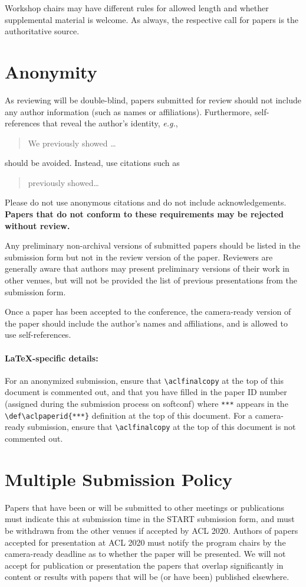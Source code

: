 \documentclass[11pt,a4paper]{article}
\begin{document}
Workshop chairs may have different rules for allowed length and whether supplemental material is welcome.
As always, the respective call for papers is the authoritative source.


\section{Anonymity}
As reviewing will be double-blind, papers submitted for review should not include any author information (such as names or affiliations). Furthermore, self-references that reveal the author's identity, \emph{e.g.},
\begin{quote}
We previously showed \citep{Gusfield:97} \ldots
\end{quote}
should be avoided. Instead, use citations such as 
\begin{quote}
\citet{Gusfield:97} previously showed\ldots
\end{quote}
Please do not use anonymous citations and do not include acknowledgements.
\textbf{Papers that do not conform to these requirements may be rejected without review.}

Any preliminary non-archival versions of submitted papers should be listed in the submission form but not in the review version of the paper.
Reviewers are generally aware that authors may present preliminary versions of their work in other venues, but will not be provided the list of previous presentations from the submission form.

Once a paper has been accepted to the conference, the camera-ready version of the paper should include the author's names and affiliations, and is allowed to use self-references.

\paragraph{\LaTeX-specific details:}
For an anonymized submission, ensure that {\small\verb|\aclfinalcopy|} at the top of this document is commented out, and that you have filled in the paper ID number (assigned during the submission process on softconf) where {\small\verb|***|} appears in the {\small\verb|\def\aclpaperid{***}|} definition at the top of this document.
For a camera-ready submission, ensure that {\small\verb|\aclfinalcopy|} at the top of this document is not commented out.


\section{Multiple Submission Policy}
Papers that have been or will be submitted to other meetings or publications must indicate this at submission time in the START submission form, and must be withdrawn from the other venues if accepted by ACL 2020. Authors of papers accepted for presentation at ACL 2020 must notify the program chairs by the camera-ready deadline as to whether the paper will be presented. We will not accept for publication or presentation the papers that overlap significantly in content or results with papers that will be (or have been) published elsewhere.
\end{document}

